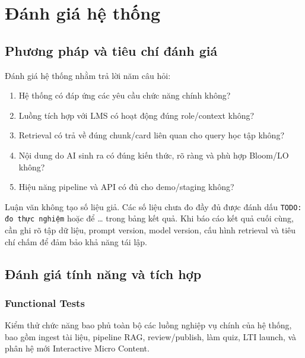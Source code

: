 \chapter{Đánh giá hệ thống}

\section{Phương pháp và tiêu chí đánh giá}

Đánh giá hệ thống nhằm trả lời năm câu hỏi:
\begin{enumerate}
    \item Hệ thống có đáp ứng các yêu cầu chức năng chính không?
    \item Luồng tích hợp với LMS có hoạt động đúng role/context không?
    \item Retrieval có trả về đúng chunk/card liên quan cho query học tập
          không?
    \item Nội dung do AI sinh ra có đúng kiến thức, rõ ràng và phù hợp
          Bloom/LO không?
    \item Hiệu năng pipeline và API có đủ cho demo/staging không?
\end{enumerate}

Luận văn không tạo số liệu giả. Các số liệu chưa đo đầy đủ được đánh dấu
\texttt{TODO: đo thực nghiệm} hoặc để \ldots{} trong bảng kết quả. Khi báo
cáo kết quả cuối cùng, cần ghi rõ tập dữ liệu, prompt version, model version,
cấu hình retrieval và tiêu chí chấm để đảm bảo khả năng tái lập.

\section{Đánh giá tính năng và tích hợp}

\subsection{Functional Tests}

Kiểm thử chức năng bao phủ toàn bộ các luồng nghiệp vụ chính của hệ thống, bao gồm ingest tài liệu, pipeline RAG, review/publish, làm quiz, LTI launch, và phân hệ mới Interactive Micro Content.


